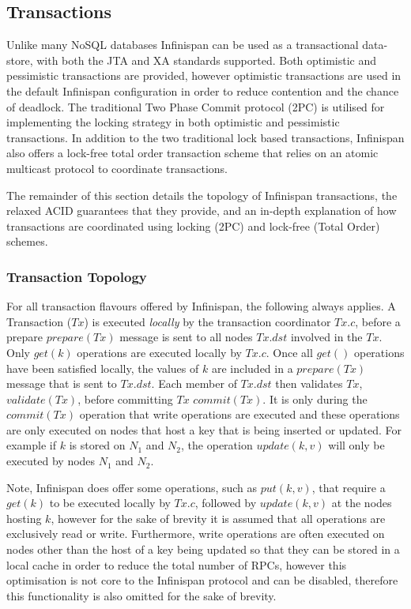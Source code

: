     \subsection{Transactions}
    Unlike many NoSQL databases Infinispan can be used as a transactional data-store, with both the JTA\citep{JTA} and XA\citep{XA} standards supported.  Both optimistic\citep{Kung:1981:OMC:319566.319567} and pessimistic transactions\citep{Bernstein:1981:CCD:356842.356846} are provided, however optimistic transactions are used in the default Infinispan configuration in order to reduce contention and the chance of deadlock.  The traditional Two Phase Commit protocol (2PC)\citep{Bernstein:1996:PTP:261193} is utilised for implementing the locking strategy in both optimistic and pessimistic transactions.  In addition to the two traditional lock based transactions, Infinispan also offers a lock-free total order transaction scheme that relies on an atomic multicast protocol to coordinate transactions.  
	    
    The remainder of this section details the topology of Infinispan transactions, the relaxed ACID guarantees that they provide, and an in-depth explanation of how transactions are coordinated using locking (2PC) and lock-free (Total Order) schemes. 
    
		\subsubsection{Transaction Topology}
		For all transaction flavours offered by Infinispan, the following always applies.  A Transaction ($Tx$) is executed \emph{locally} by the transaction coordinator $Tx.c$, before a prepare $prepare(Tx)$ message is sent to all nodes $Tx.dst$ involved in the $Tx$.  Only $get(k)$ operations are executed locally by $Tx.c$.  Once all $get()$ operations have been satisfied locally, the values of $k$ are included in a $prepare(Tx)$ message that is sent to $Tx.dst$.  Each member of $Tx.dst$ then validates $Tx$, $validate(Tx)$, before committing $Tx$ $commit(Tx)$.  It is only during the $commit(Tx)$ operation that write operations are executed and these operations are only executed on nodes that host a key that is being inserted or updated.  For example if $k$ is stored on $N_1$ and $N_2$, the operation $update(k, v)$ will only be executed by nodes $N_1$ and $N_2$.  
		
		Note, Infinispan does offer some operations, such as $put(k,v)$, that require a $get(k)$ to be executed locally by $Tx.c$, followed by $update(k,v)$ at the nodes hosting $k$, however for the sake of brevity it is assumed that all operations are exclusively read or write.  Furthermore, write operations are often executed on nodes other than the host of a key being updated so that they can be stored in a local cache in order to reduce the total number of RPCs, however this optimisation is not core to the Infinispan protocol and can be disabled, therefore this functionality is also omitted for the sake of brevity.  
    
